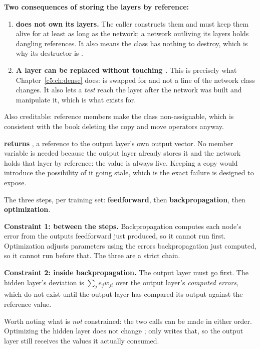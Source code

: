 \textbf{Two consequences of storing the layers by reference:}
\begin{enumerate}
  \item \textbf{ does not own its layers.} The caller constructs them and must keep
    them alive for at least as long as the network; a network outliving its layers holds dangling
    references. It also means the class has nothing to destroy, which is why its destructor is
    .
  \item \textbf{A layer can be replaced without touching .} This is precisely what
    Chapter~\ref{c5:ch:dense} does:  is swapped for  and not a line of the
    network class changes. It also lets a \emph{test} reach the layer after the network was built
    and manipulate it, which is what  exists for.
\end{enumerate}
Also creditable: reference members make the class non-assignable, which is consistent with the
book deleting the copy and move operators anyway. 

\textbf{ returns }, a reference to the output layer's
own output vector. No member variable is needed because the output layer already stores it and the
network holds that layer by reference: the value is always live. Keeping a copy would introduce the
possibility of it going stale, which is the exact failure  is designed to expose.

The three steps, per training set: \textbf{feedforward}, then \textbf{backpropagation}, then
\textbf{optimization}. 

\textbf{Constraint 1: between the steps.} Backpropagation computes each node's error from the
outputs feedforward just produced, so it cannot run first. Optimization adjusts parameters using the
errors backpropagation just computed, so it cannot run before that. The three are a strict chain.

\textbf{Constraint 2: inside backpropagation.} The output layer must go first. The hidden layer's
deviation is $\sum_j e_j w_{ji}$ over the output layer's \emph{computed errors}, which do not exist
until the output layer has compared its output against the reference value. 

Worth noting what is \emph{not} constrained: the two  calls can be made in either
order. Optimizing the hidden layer does not change ; only
 writes that, so the output layer still receives the values it actually
consumed.

